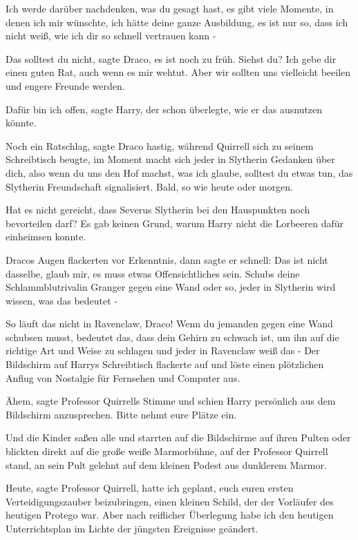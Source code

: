 \glqq{}Ich werde darüber nachdenken, was du gesagt hast, es gibt viele Momente,
in denen ich mir wünschte, ich hätte deine ganze Ausbildung, es ist nur so, dass
ich nicht weiß, wie ich dir so schnell vertrauen kann -\grqq{}

\glqq{}Das solltest du nicht\grqq{}, sagte Draco, \glqq{}es ist noch zu früh.
Siehst du? Ich gebe dir einen guten Rat, auch wenn es mir wehtut. Aber wir
sollten uns vielleicht beeilen und engere Freunde werden.\grqq{}

\glqq{}Dafür bin ich offen\grqq{}, sagte Harry, der schon überlegte, wie er das
ausnutzen könnte.

\glqq{}Noch ein Ratschlag\grqq{}, sagte Draco hastig, während Quirrell sich zu
seinem Schreibtisch beugte, \glqq{}im Moment macht sich jeder in Slytherin
Gedanken über dich, also wenn du uns den Hof machst, was ich glaube, solltest du
etwas tun, das Slytherin Freundschaft signalisiert. Bald, so wie heute oder
morgen.\grqq{}

\glqq{}Hat es nicht gereicht, dass Severus Slytherin bei den Hauspunkten noch
bevorteilen darf?\grqq{} Es gab keinen Grund, warum Harry nicht die Lorbeeren
dafür einheimsen konnte.

Dracos Augen flackerten vor Erkenntnis, dann sagte er schnell: \glqq{}Das ist
nicht dasselbe, glaub mir, es muss etwas Offensichtliches sein. Schubs deine
Schlammblutrivalin Granger gegen eine Wand oder so, jeder in Slytherin wird
wissen, was das bedeutet -\grqq{}

\glqq{}So läuft das nicht in Ravenclaw, Draco! Wenn du jemanden gegen eine Wand
schubsen musst, bedeutet das, dass dein Gehirn zu schwach ist, um ihn auf die
richtige Art und Weise zu schlagen und jeder in Ravenclaw weiß das -\grqq{} Der
Bildschirm auf Harrys Schreibtisch flackerte auf und löste einen plötzlichen
Anflug von Nostalgie für Fernsehen und Computer aus.

\glqq{}Ähem\grqq{}, sagte Professor Quirrells Stimme und schien Harry persönlich
aus dem Bildschirm anzusprechen. \glqq{}Bitte nehmt eure Plätze ein.\grqq{}

Und die Kinder saßen alle und starrten auf die Bildschirme auf ihren Pulten oder
blickten direkt auf die große weiße Marmorbühne, auf der Professor Quirrell
stand, an sein Pult gelehnt auf dem kleinen Podest aus dunklerem Marmor.

\glqq{}Heute\grqq{}, sagte Professor Quirrell, \glqq{}hatte ich geplant, euch
euren ersten Verteidigungszauber beizubringen, einen kleinen Schild, der der
Vorläufer des heutigen Protego war. Aber nach reiflicher Überlegung habe ich den
heutigen Unterrichtsplan im Lichte der jüngsten Ereignisse geändert.\grqq{}


